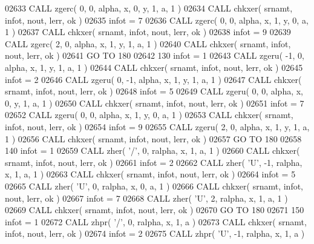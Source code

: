 \begin{DoxyCode}
02633       \textcolor{keyword}{CALL }zgerc( 0, 0, alpha, x, 0, y, 1, a, 1 )
02634       \textcolor{keyword}{CALL }chkxer( srnamt, infot, nout, lerr, ok )
02635       infot = 7
02636       \textcolor{keyword}{CALL }zgerc( 0, 0, alpha, x, 1, y, 0, a, 1 )
02637       \textcolor{keyword}{CALL }chkxer( srnamt, infot, nout, lerr, ok )
02638       infot = 9
02639       \textcolor{keyword}{CALL }zgerc( 2, 0, alpha, x, 1, y, 1, a, 1 )
02640       \textcolor{keyword}{CALL }chkxer( srnamt, infot, nout, lerr, ok )
02641       \textcolor{keywordflow}{GO TO} 180
02642   130 infot = 1
02643       \textcolor{keyword}{CALL }zgeru( -1, 0, alpha, x, 1, y, 1, a, 1 )
02644       \textcolor{keyword}{CALL }chkxer( srnamt, infot, nout, lerr, ok )
02645       infot = 2
02646       \textcolor{keyword}{CALL }zgeru( 0, -1, alpha, x, 1, y, 1, a, 1 )
02647       \textcolor{keyword}{CALL }chkxer( srnamt, infot, nout, lerr, ok )
02648       infot = 5
02649       \textcolor{keyword}{CALL }zgeru( 0, 0, alpha, x, 0, y, 1, a, 1 )
02650       \textcolor{keyword}{CALL }chkxer( srnamt, infot, nout, lerr, ok )
02651       infot = 7
02652       \textcolor{keyword}{CALL }zgeru( 0, 0, alpha, x, 1, y, 0, a, 1 )
02653       \textcolor{keyword}{CALL }chkxer( srnamt, infot, nout, lerr, ok )
02654       infot = 9
02655       \textcolor{keyword}{CALL }zgeru( 2, 0, alpha, x, 1, y, 1, a, 1 )
02656       \textcolor{keyword}{CALL }chkxer( srnamt, infot, nout, lerr, ok )
02657       \textcolor{keywordflow}{GO TO} 180
02658   140 infot = 1
02659       \textcolor{keyword}{CALL }zher( \textcolor{stringliteral}{'/'}, 0, ralpha, x, 1, a, 1 )
02660       \textcolor{keyword}{CALL }chkxer( srnamt, infot, nout, lerr, ok )
02661       infot = 2
02662       \textcolor{keyword}{CALL }zher( \textcolor{stringliteral}{'U'}, -1, ralpha, x, 1, a, 1 )
02663       \textcolor{keyword}{CALL }chkxer( srnamt, infot, nout, lerr, ok )
02664       infot = 5
02665       \textcolor{keyword}{CALL }zher( \textcolor{stringliteral}{'U'}, 0, ralpha, x, 0, a, 1 )
02666       \textcolor{keyword}{CALL }chkxer( srnamt, infot, nout, lerr, ok )
02667       infot = 7
02668       \textcolor{keyword}{CALL }zher( \textcolor{stringliteral}{'U'}, 2, ralpha, x, 1, a, 1 )
02669       \textcolor{keyword}{CALL }chkxer( srnamt, infot, nout, lerr, ok )
02670       \textcolor{keywordflow}{GO TO} 180
02671   150 infot = 1
02672       \textcolor{keyword}{CALL }zhpr( \textcolor{stringliteral}{'/'}, 0, ralpha, x, 1, a )
02673       \textcolor{keyword}{CALL }chkxer( srnamt, infot, nout, lerr, ok )
02674       infot = 2
02675       \textcolor{keyword}{CALL }zhpr( \textcolor{stringliteral}{'U'}, -1, ralpha, x, 1, a )

\end{DoxyCode}
